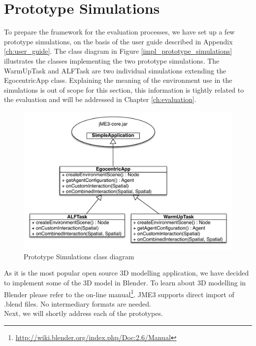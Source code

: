\section{Prototype Simulations} %
\label{sec:impl_prototype_simulations}
To prepare the framework for the evaluation processes, we have set up a few prototype simulations, on the basis of the user guide described in Appendix \ref{ch:user_guide}. The class diagram in Figure \ref{impl_prototype_simulations} illustrates the classes implementing the two prototype simulations. The WarmUpTask and ALFTask are two individual simulations extending the EgocentricApp class. Explaining the meaning of the environment use in the simulations is out of scope for this section, this information is tightly related to the evaluation and will be addressed in Chapter \ref{ch:evaluation}.
\begin{figure}[H]
	\centering
	\includegraphics[width=\linewidth]{gfx/Chapter4/prototype_simulations}
	\caption{Prototype Simulations class diagram}
	\label{fig:impl_prototype_simulations}
\end{figure}

As it is the most popular open source 3D modelling application, we have decided to implement some of the 3D model in Blender. To learn about 3D modelling in Blender please refer to the on-line manual\footnote{\url{http://wiki.blender.org/index.php/Doc:2.6/Manual}}. JME3 supports direct import of .blend files. No intermediary formats are needed.\\

Next, we will shortly address each of the prototypes.

